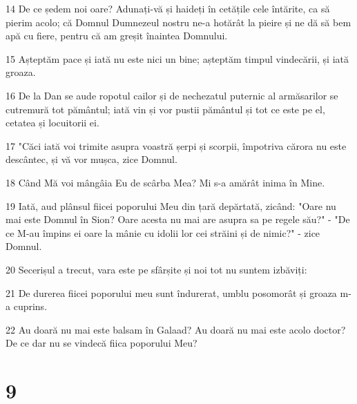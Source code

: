 \par 14 De ce ședem noi oare? Adunați-vă și haideți în cetățile cele întărite, ca să pierim acolo; că Domnul Dumnezeul nostru ne-a hotărât la pieire și ne dă să bem apă cu fiere, pentru că am greșit înaintea Domnului.
\par 15 Așteptăm pace și iată nu este nici un bine; așteptăm timpul vindecării, și iată groaza.
\par 16 De la Dan se aude ropotul cailor și de nechezatul puternic al armăsarilor se cutremură tot pământul; iată vin și vor pustii pământul și tot ce este pe el, cetatea și locuitorii ei.
\par 17 "Căci iată voi trimite asupra voastră șerpi și scorpii, împotriva cărora nu este descântec, și vă vor mușca, zice Domnul.
\par 18 Când Mă voi mângâia Eu de scârba Mea? Mi s-a amărât inima în Mine.
\par 19 Iată, aud plânsul fiicei poporului Meu din țară depărtată, zicând: "Oare nu mai este Domnul în Sion? Oare acesta nu mai are asupra sa pe regele său?" - "De ce M-au împins ei oare la mânie cu idolii lor cei străini și de nimic?" - zice Domnul.
\par 20 Secerișul a trecut, vara este pe sfârșite și noi tot nu suntem izbăviți:
\par 21 De durerea fiicei poporului meu sunt îndurerat, umblu posomorât și groaza m-a cuprins.
\par 22 Au doară nu mai este balsam în Galaad? Au doară nu mai este acolo doctor? De ce dar nu se vindecă fiica poporului Meu?

\chapter{9}

